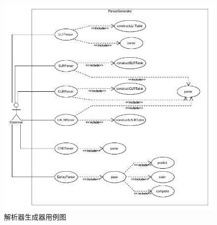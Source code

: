 \documentclass{beamer}
\begin{document}
  \begin{frame}
\begin{figure}
\includegraphics[height=0.8\textheight]{ParserGenerators.jpg}
\caption{解析器生成器用例图}
\label{fig: pg}
\end{figure}
 \end{frame}
 
\end{document}
